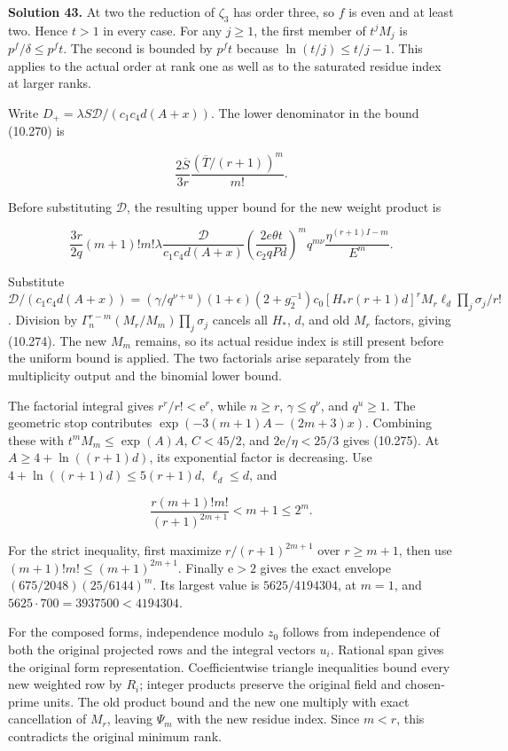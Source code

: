 \documentclass[
  11pt,
  a4paper,
]{article}
\begin{document}
\textbf{Solution 43.} At two the reduction of \(\zeta_3\) has order
three, so \(f\) is even and at least two. Hence \(t>1\) in every case.
For any \(j\ge1\), the first member of \(t^jM_j\) is
\(p^f/\delta\le p^ft\). The second is bounded by \(p^ft\) because
\(\ln(t/j)\le t/j-1\). This applies to the actual order at rank one as
well as to the saturated residue index at larger ranks.

Write \(D_+=\lambda S\mathcal D/(c_1c_4d(A+x))\). The lower denominator
in the bound (10.270) is

\[
\frac{2\overline S}{3r}\frac{(\overline T/(r+1))^m}{m!}.
\]

Before substituting \(\mathcal D\), the resulting upper bound for the
new weight product is

\[
\frac{3r}{2q}(m+1)!m!\lambda
\frac{\mathcal D}{c_1c_4d(A+x)}
\left(\frac{2e\theta t}{c_2qPd}\right)^m
q^{m\nu}\frac{\eta^{(r+1)I-m}}{E^m}.
\]

Substitute \(\mathcal D/(c_1c_4d(A+x))
=(\gamma/q^{\nu+u})(1+\epsilon)(2+g_2^{-1})c_0
[H_*r(r+1)d]^rM_r\ell_d\prod_j\sigma_j/r!\). Division by
\(\Gamma_n^{r-m}(M_r/M_m)\prod_j\sigma_j\) cancels all \(H_*\), \(d\),
and old \(M_r\) factors, giving (10.274). The new \(M_m\) remains, so
its actual residue index is still present before the uniform bound is
applied. The two factorials arise separately from the multiplicity
output and the binomial lower bound.

The factorial integral gives \(r^r/r!<\mathrm e^r\), while \(n\ge r\),
\(\gamma\le q^\nu\), and \(q^u\ge1\). The geometric stop contributes
\(\exp(-3(m+1)A-(2m+3)x)\). Combining these with \(t^mM_m\le\exp(A)A\),
\(C<45/2\), and \(2\mathrm e/\eta<25/3\) gives (10.275). At
\(A\ge4+\ln((r+1)d)\), its exponential factor is decreasing. Use
\(4+\ln((r+1)d)\le5(r+1)d\), \(\ell_d\le d\), and

\[
\frac{r(m+1)!m!}{(r+1)^{2m+1}}
<m+1\le2^m.
\]

For the strict inequality, first maximize \(r/(r+1)^{2m+1}\) over
\(r\ge m+1\), then use \((m+1)!m!\le(m+1)^{2m+1}\). Finally
\(\mathrm e>2\) gives the exact envelope \((675/2048)(25/6144)^m\). Its
largest value is \(5625/4194304\), at \(m=1\), and
\(5625\cdot700=3937500<4194304\).

For the composed forms, independence modulo \(z_0\) follows from
independence of both the original projected rows and the integral
vectors \(u_i\). Rational span gives the original form representation.
Coefficientwise triangle inequalities bound every new weighted row by
\(R_i\); integer products preserve the original field and chosen-prime
units. The old product bound and the new one multiply with exact
cancellation of \(M_r\), leaving \(\Psi_m\) with the new residue index.
Since \(m<r\), this contradicts the original minimum rank.
\end{document}
